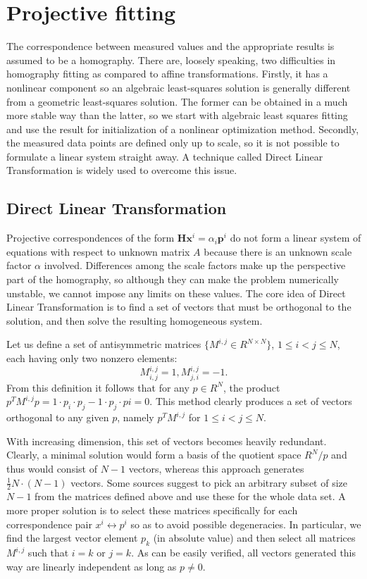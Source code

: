 \section{Projective fitting}

The correspondence between measured values and the appropriate results is assumed to be a homography.
There are, loosely speaking, two difficulties in homography fitting as compared to affine transformations.
Firstly, it has a nonlinear component so an algebraic least-squares solution is generally different from a geometric least-squares solution.
The former can be obtained in a much more stable way than the latter, so we start with algebraic least squares fitting and use the result for initialization of a nonlinear optimization method.
Secondly, the measured data points are defined only up to scale, so it is not possible to formulate a linear system straight away.
A technique called Direct Linear Transformation is widely used to overcome this issue.

\subsection{Direct Linear Transformation}

Projective correspondences of the form $\mathbf H \mathbf x^i = \alpha_i \mathbf p^i$ do not form a linear system of equations with respect to unknown matrix $A$ because there is an unknown scale factor $\alpha$ involved.
Differences among the scale factors make up the perspective part of the homography, so although they can make the problem numerically unstable, we cannot impose any limits on these values.
The core idea of Direct Linear Transformation is to find a set of vectors that must be orthogonal to the solution, and then solve the resulting homogeneous system.

Let us define a set of antisymmetric matrices $\{M^{i, j} \in R^{N \times N}\}$, $1 \leq i < j \leq N$, each having only two nonzero elements:
$$M^{i, j}_{i, j} = 1,
M^{i, j}_{j, i} = -1.$$
From this definition it follows that for any $p \in R^N$, the product $p^T M^{i, j} p = 1 \cdot p_{i} \cdot p_{j} - 1 \cdot p_{j} \cdot p{i} = 0$.
This method clearly produces a set of vectors orthogonal to any given $p$, namely $p^T M^{i, j}$ for $1 \leq i < j \leq N$.

With increasing dimension, this set of vectors becomes heavily redundant.
Clearly, a minimal solution would form a basis of the quotient space $R^N / p$ and thus would consist of $N - 1$ vectors, whereas this approach generates $\frac {1} {2} N \cdot (N - 1)$ vectors.
Some sources\cite{MVG} suggest to pick an arbitrary subset of size $N - 1$ from the matrices defined above and use these for the whole data set.
A more proper solution is to select these matrices specifically for each correspondence pair $x^i \leftrightarrow p^i$ so as to avoid possible degeneracies.
In particular, we find the largest vector element $p_k$ (in absolute value) and then select all matrices $M^{i, j}$ such that $i = k$ or $j = k$.
As can be easily verified, all vectors generated this way are linearly independent as long as $p \neq 0$.

